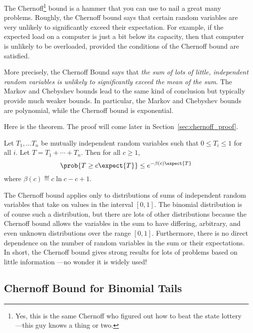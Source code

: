 The Chernoff\footnote{Yes, this is the same Chernoff who figured out
  how to beat the state lottery ---this guy knows a thing or two.}
bound is a hammer that you can use to nail a great many problems.
Roughly, the Chernoff bound says that certain random variables are
very unlikely to significantly exceed their expectation.  For example,
if the expected load on a computer is just a bit below its capacity,
then that computer is unlikely to be overloaded, provided the
conditions of the Chernoff bound are satisfied.

More precisely, the Chernoff Bound says that \emph{the sum of lots of
  little, independent random variables is unlikely to significantly
  exceed the mean of the sum}.  The Markov and Chebyshev bounds lead
to the same kind of conclusion but typically provide much weaker
bounds.  In particular, the Markov and Chebyshev bounds are
polynomial, while the Chernoff bound is exponential.

Here is the theorem.  The proof will come later in
Section~\ref{sec:chernoff_proof}.

\begin{theorem}
\label{thm:chernoff}
Let $T_1, \dots T_n$ be mutually independent random variables such
that $0 \leq T_i \leq 1$ for all $i$.  Let $T = T_1 + \cdots + T_n$.
Then for all $c \geq 1$,
\begin{equation}\label{chernoff-leq}
\prob{T \geq c \expect{T}} \leq e^{-\beta(c) \expect{T}}
\end{equation}
where $\beta(c) \eqdef c \ln c - c + 1$.
\end{theorem}

The Chernoff bound applies only to distributions of sums of
independent random variables that take on values in the interval $[0,
  1]$.  The binomial distribution is of course such a distribution,
but there are lots of other distributions because the Chernoff bound
allows the variables in the sum to have differing, arbitrary, and even
unknown distributions over the range $[0, 1]$.  Furthermore, there is
no direct dependence on the number of random variables in the sum or
their expectations.  In short, the Chernoff bound gives strong results
for lots of problems based on little information ---no wonder it is
widely used!

\subsection{Chernoff Bound for Binomial Tails}

